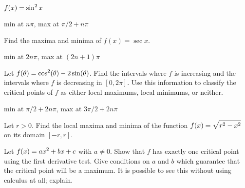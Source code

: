 \begin{exercises}
\exercise $\displaystyle f(x) = \sin ^2 x$
\begin{answer} min at $n\pi$, max at $\pi/2+n\pi$
\end{answer}

\endtwocol
\bsk
\exercise Find the maxima and minima of $f(x)=\sec x$.
\begin{answer} min at $2n\pi$, max at $(2n+1)\pi$
\end{answer}

\exercise  Let $\displaystyle f(\theta) = \cos^2(\theta) -
 2\sin(\theta)$.  Find the intervals where $f$ is increasing and the
 intervals where $f$ is decreasing in $[0,2\pi]$.  Use this
 information to classify the critical points of $f$ as either local
 maximums, local minimums, or neither.
\begin{answer} min at $\pi/2+2n\pi$, max at $3\pi/2+2n\pi$
\end{answer}

\exercise Let $r>0$. Find the local
maxima and minima of the function $\displaystyle f(x)
=\sqrt{r^2 -x^2 }$ on its domain $[-r,r]$.

\exercise Let $\displaystyle f(x) =a x^2 + bx + c$ with $a\neq 0$. Show that $f$
has exactly one critical point using the first derivative test. Give
conditions on $a$ and $b$ which guarantee that the critical point will
be a maximum. It is possible to see this without using calculus at
all; explain.

\end{exercises}

